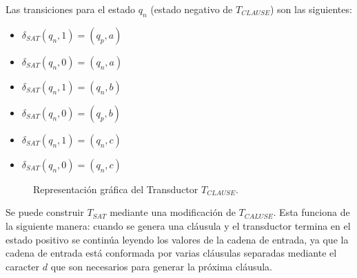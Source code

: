\documentclass[12pt]{article}
\begin{document}
Las transiciones para el estado $q_n$ (estado negativo de $T_{CLAUSE}$) son las siguientes:
\begin{multicols}{2}
    \begin{itemize}
        \item $\delta_{SAT}(q_{n},1)=(q_{p},a)$
        \item $\delta_{SAT}(q_{n},0)=(q_{n},a)$
        \item $\delta_{SAT}(q_{n},1)=(q_{n},b)$
        \item $\delta_{SAT}(q_{n},0)=(q_{p},b)$
        \item $\delta_{SAT}(q_{n},1)=(q_{n},c)$
        \item $\delta_{SAT}(q_{n},0)=(q_{n},c)$
    \end{itemize}
\end{multicols}

\begin{figure}[h]
    \centering  \begin{otherlanguage}{english}
    \end{otherlanguage}
    \caption{Representación gráfica del Transductor $T_{CLAUSE}$.}
    \label{fig:transducer_clause} %
\end{figure}

Se puede construir $T_{SAT}$ mediante una modificación de $T_{CALUSE}$. Esta  funciona de la siguiente manera: cuando se genera una cláusula y el transductor termina en el estado positivo se continúa leyendo los valores de la cadena de entrada, ya que la cadena de entrada está conformada por varias cláusulas separadas mediante el caracter $d$ que son necesarios para generar la próxima cláusula.
\end{document}

